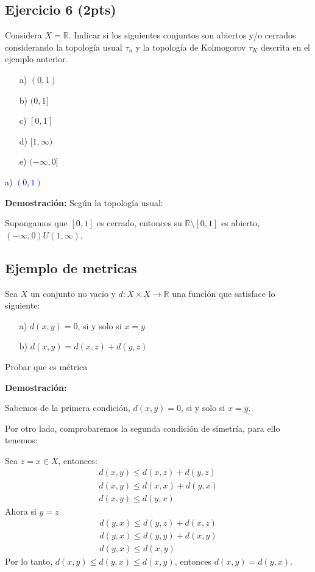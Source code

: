 \documentclass[
]{article}
\begin{document}
\hypertarget{ejercicio-6-2pts}{%
\subsection{Ejercicio 6 (2pts)}\label{ejercicio-6-2pts}}

Considera \(X=\mathbb{R}\). Indicar si los siguientes conjuntos son
abiertos y/o cerrados considerando la topología usual \(\tau_u\) y la
topología de Kolmogorov \(\tau_K\) descrita en el ejemplo anterior.

\begin{itemize}
\item[a)] $(0,1)$
\item[b)] $(0,1]$
\item[c)] $[0,1]$
\item[d)] $[1, \infty)$
\item[e)] $(- \infty,0]$
\end{itemize}

\textcolor{blue}{a) $(0,1)$}

\textbf{Demostración:} Según la topología usual:

Supongamos que \([0,1]\) es cerrado, entonces su
\(\mathbb{R} \setminus [0,1]\) es abierto, \((-\infty,0)U(1,\infty)\),

\hypertarget{ejemplo-de-metricas}{%
\subsection{Ejemplo de metricas}\label{ejemplo-de-metricas}}

Sea \(X\) un conjunto no vacio y
\(d: X \times X \longrightarrow \mathbb{R}\) una función que satisface
lo siguiente:

\begin{itemize}
\item [a)] $d(x,y)=0$, si y solo si $x=y$
\item [b)] $d(x,y)= d(x,z)+d(y,z)$
\end{itemize}

Probar que es métrica

\textbf{Demostración:}

Sabemos de la primera condición, \(d(x,y)=0\), si y solo si \(x=y\).

Por otro lado, comprobaremos la segunda condición de simetría, para ello
tenemos:

Sea \(z=x \in X\), entonces: \begin{eqnarray*}
d(x,y) \leq  d(x,z) + d(y,z)\\
d(x,y) \leq  d(x,x) + d(y,x)\\
d(x,y) \leq  d(y,x)
\end{eqnarray*} Ahora si \(y=z\) \begin{eqnarray*}
d(y,x) \leq  d(y,z) + d(x,z)\\
d(y,x) \leq  d(y,y) + d(x,y)\\
d(y,x) \leq  d(x,y)
\end{eqnarray*} Por lo tanto, \(d(x,y) \leq d(y,x) \leq d(x,y)\),
entonces \(d(x,y)= d(y,x)\).
\end{document}
